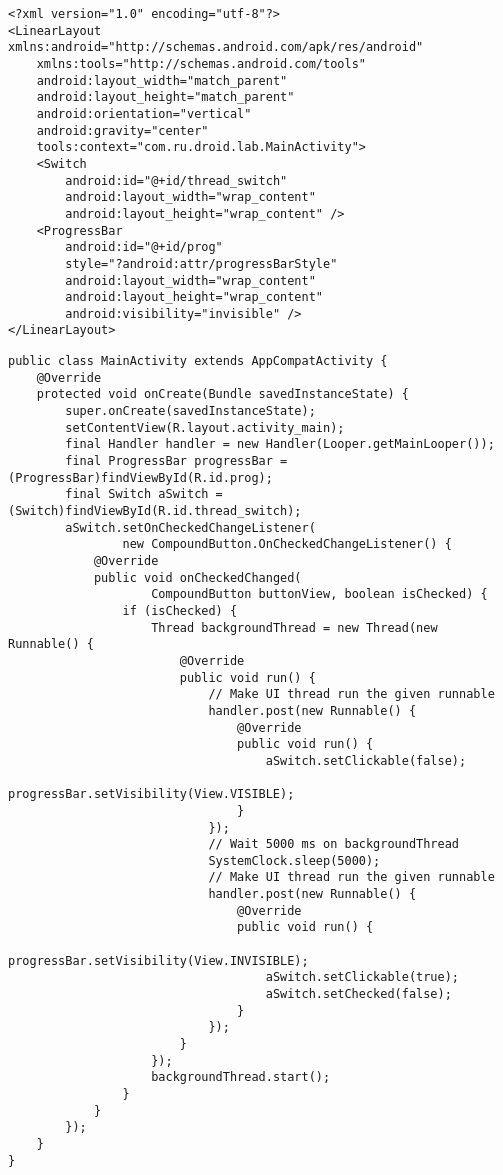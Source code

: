 \begin{lstlisting}[style=A_XML,caption={Layout for handler program},label={listing:switchlayout}]
<?xml version="1.0" encoding="utf-8"?>
<LinearLayout xmlns:android="http://schemas.android.com/apk/res/android"
    xmlns:tools="http://schemas.android.com/tools"
    android:layout_width="match_parent"
    android:layout_height="match_parent"
    android:orientation="vertical"
    android:gravity="center"
    tools:context="com.ru.droid.lab.MainActivity">
    <Switch
        android:id="@+id/thread_switch"
        android:layout_width="wrap_content"
        android:layout_height="wrap_content" />
    <ProgressBar
        android:id="@+id/prog"
        style="?android:attr/progressBarStyle"
        android:layout_width="wrap_content"
        android:layout_height="wrap_content"
        android:visibility="invisible" />
</LinearLayout>
\end{lstlisting}

\begin{lstlisting}[style=A_Java,caption={Background job with a thread and communication to UI thread with a handler},label={listing:layoutprg}]
public class MainActivity extends AppCompatActivity {
    @Override
    protected void onCreate(Bundle savedInstanceState) {
        super.onCreate(savedInstanceState);
        setContentView(R.layout.activity_main);
        final Handler handler = new Handler(Looper.getMainLooper());
        final ProgressBar progressBar = (ProgressBar)findViewById(R.id.prog);
        final Switch aSwitch = (Switch)findViewById(R.id.thread_switch);
        aSwitch.setOnCheckedChangeListener(
                new CompoundButton.OnCheckedChangeListener() {
            @Override
            public void onCheckedChanged(
                    CompoundButton buttonView, boolean isChecked) {
                if (isChecked) {
                    Thread backgroundThread = new Thread(new Runnable() {
                        @Override
                        public void run() {
                            // Make UI thread run the given runnable
                            handler.post(new Runnable() {
                                @Override
                                public void run() {
                                    aSwitch.setClickable(false);
                                    progressBar.setVisibility(View.VISIBLE);
                                }
                            });
                            // Wait 5000 ms on backgroundThread
                            SystemClock.sleep(5000);
                            // Make UI thread run the given runnable
                            handler.post(new Runnable() {
                                @Override
                                public void run() {
                                    progressBar.setVisibility(View.INVISIBLE);
                                    aSwitch.setClickable(true);
                                    aSwitch.setChecked(false);
                                }
                            });
                        }
                    });
                    backgroundThread.start();
                }
            }
        });
    }
}
\end{lstlisting}

